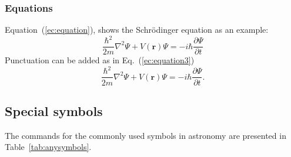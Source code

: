 \documentclass[10pt,letter,twoside]{rmat-rho}
\begin{document}
\subsubsection{Equations}

Equation~(\ref{ec:equation}), shows the Schrödinger equation as an example:     \begin{equation} \label{ec:equation}
         \frac{\hbar^2}{2m}\nabla^2\Psi + V(\mathbf{r})\Psi = -i\hbar \frac{\partial\Psi}{\partial t}
    \end{equation} 
Punctuation can be added as in Eq.~(\ref{ec:equation3})
    \begin{equation} \label{ec:equation3}
         \frac{\hbar^2}{2m} \nabla^2\Psi + V(\mathbf{r})\Psi = -i\hbar \frac{\partial\Psi}{\partial t}.
    \end{equation} 
    
\subsection{Special symbols}

The commands for the commonly used symbols in astronomy are presented in Table~\ref{tab:anysymbols}.
\end{document}
